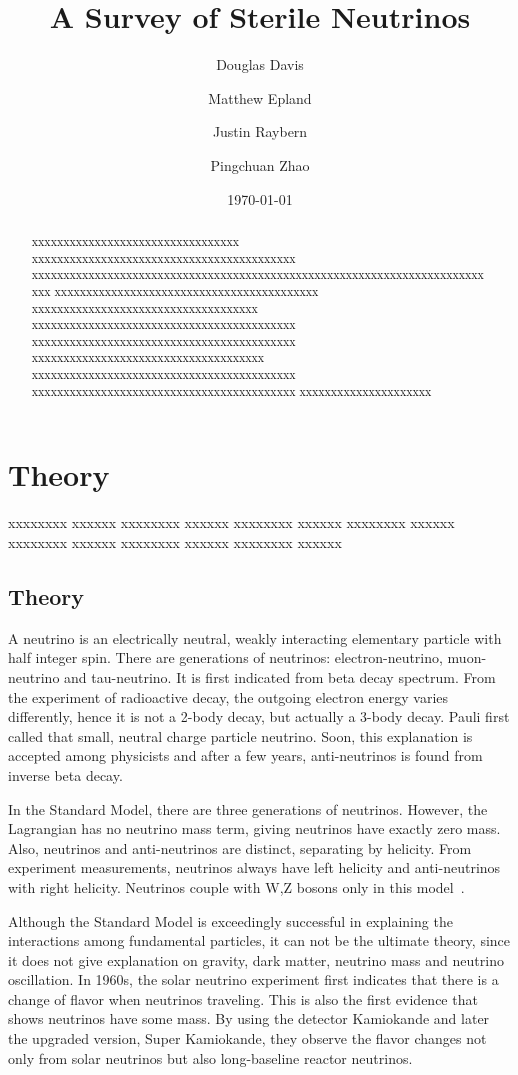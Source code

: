 \documentclass[aps,prd,twocolumn,nofootinbib]{revtex4-1}
\begin{document}
\title{A Survey of Sterile Neutrinos}
\author{Douglas Davis}
\author{Matthew Epland}
\author{Justin Raybern}
\author{Pingchuan Zhao}
\date{\today}
\begin{abstract}
  xxxxxxxxxxxxxxxxxxxxxxxxxxxxxxxxx xxxxxxxxxxxxxxxxxxxxxxxxxxxxxxxxxxxxxxxxxx xxxxxxxxxxxxxxxxxxxxxxxxxxxxxxxxxxxxxxxxxxxxxxxxxxxxxxxxxxxxxxxxxxxxxxxxxxx xxxxxxxxxxxxxxxxxxxxxxxxxxxxxxxxxxxxxxxxxx xxxxxxxxxxxxxxxxxxxxxxxxxxxxxxxxxxxx xxxxxxxxxxxxxxxxxxxxxxxxxxxxxxxxxxxxxxxxxx xxxxxxxxxxxxxxxxxxxxxxxxxxxxxxxxxxxxxxxxxx xxxxxxxxxxxxxxxxxxxxxxxxxxxxxxxxxxxxx xxxxxxxxxxxxxxxxxxxxxxxxxxxxxxxxxxxxxxxxxx xxxxxxxxxxxxxxxxxxxxxxxxxxxxxxxxxxxxxxxxxx xxxxxxxxxxxxxxxxxxxxx
\end{abstract}\maketitle
\section{Theory}
\label{sec:theory}
xxxxxxxx xxxxxx xxxxxxxx xxxxxx xxxxxxxx xxxxxx xxxxxxxx xxxxxx xxxxxxxx xxxxxx xxxxxxxx xxxxxx xxxxxxxx xxxxxx
\subsection{Theory}
A neutrino is an electrically neutral, weakly interacting elementary particle with half integer spin. There are generations of neutrinos: electron-neutrino, muon-neutrino and tau-neutrino. It is first indicated from beta decay spectrum. From the experiment of radioactive decay, the outgoing electron energy varies differently, hence it is not a 2-body decay, but actually a 3-body decay. Pauli first called that small, neutral charge particle neutrino. Soon, this explanation is accepted among physicists and after a few years, anti-neutrinos is found from inverse beta decay. 

In the Standard Model, there are three generations of neutrinos. However, the Lagrangian has no neutrino mass term, giving neutrinos have exactly zero mass. Also, neutrinos and anti-neutrinos are distinct, separating by helicity. From experiment measurements, neutrinos always have left helicity and anti-neutrinos with right helicity. Neutrinos couple with W,Z bosons only in this model~\cite{ping1}.

Although the Standard Model is exceedingly successful in explaining the interactions among fundamental particles, it can not be the ultimate theory, since it does not give explanation on gravity, dark matter, neutrino mass and neutrino oscillation. In 1960s, the solar neutrino experiment first indicates that there is a change of flavor when neutrinos traveling. This is also the first evidence that shows neutrinos have some mass. By using the detector Kamiokande and later the upgraded version, Super Kamiokande, they observe the flavor changes not only from solar neutrinos but also long-baseline reactor neutrinos. 
\end{document}
